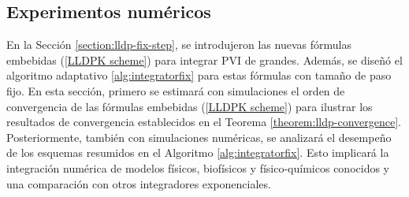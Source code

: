 \subsection{Experimentos numéricos}\label{section:num-exp-lldp-fix-step}
En la Sección \ref{section:lldp-fix-step}, se introdujeron las nuevas fórmulas embebidas (\ref{LLDPK scheme}) para integrar PVI de grandes. Además, se diseñó el algoritmo adaptativo \ref{alg:integratorfix} para estas fórmulas con tamaño de paso fijo. En esta sección, primero se estimará con simulaciones el orden de convergencia de las fórmulas embebidas (\ref{LLDPK scheme}) para ilustrar los resultados de convergencia establecidos en el Teorema \ref{theorem:lldp-convergence}. Posteriormente, también con simulaciones numéricas, se analizará el desempeño de los esquemas resumidos en el Algoritmo \ref{alg:integratorfix}. Esto implicará la integración numérica de modelos físicos, biofísicos y físico-químicos conocidos y una comparación con otros integradores exponenciales.

